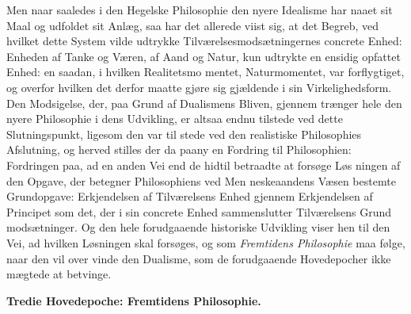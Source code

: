 Men naar saaledes i den Hegelske Philosophie den nyere
Idealisme har naaet sit Maal og udfoldet sit Anlæg, saa har
det allerede viist sig, at det Begreb, ved hvilket dette System
vilde udtrykke Tilværelsesmodsætningernes concrete Enhed:
Enheden af Tanke og Væren, af Aand og Natur, kun udtrykte
 en ensidig opfattet Enhed: en saadan, i hvilken Realitetsmo\-%
mentet, Naturmomentet, var forflygtiget, og overfor hvilken det
derfor maatte gjøre sig gjældende i sin Virkelighedsform. Den
Modsigelse, der, paa Grund af Dualismens Bliven, gjennem\-%
trænger hele den nyere Philosophie i dens Udvikling, er altsaa
endnu tilstede ved dette Slutningspunkt, ligesom den var til\-%
stede ved den realistiske Philosophies Afslutning, og herved
stilles der da paany en Fordring til Philosophien: Fordringen
paa, ad en anden Vei end de hidtil betraadte at forsøge Løs\-%
ningen af den Opgave, der betegner Philosophiens ved Men\-%
neskeaandens Væsen bestemte Grundopgave: Erkjendelsen af
Tilværelsens Enhed gjennem Erkjendelsen af Principet som det,
der i sin concrete Enhed sammenslutter Tilværelsens Grund\-%
modsætninger. Og den hele forudgaaende historiske Udvikling
viser hen til den Vei, ad hvilken Løsningen skal forsøges, og som
\emph{Fremtidens Philosophie} maa følge, naar den vil over\-%
vinde den Dualisme, som de forudgaaende Hovedepocher ikke
mægtede at betvinge.

\divrule

\begin{center}
\textbf{\large Tredie Hovedepoche: Fremtidens Philosophie.}
\end{center}

